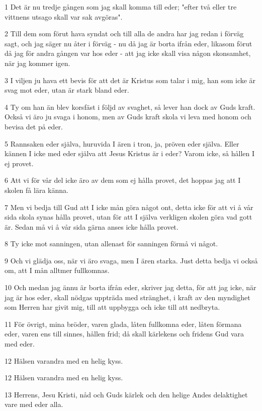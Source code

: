 \par 1 Det är nu tredje gången som jag skall komma till eder; "efter två eller tre vittnens utsago skall var sak avgöras".
\par 2 Till dem som förut hava syndat och till alla de andra har jag redan i förväg sagt, och jag säger nu åter i förväg - nu då jag är borta ifrån eder, likasom förut då jag för andra gången var hos eder - att jag icke skall visa någon skonsamhet, när jag kommer igen.
\par 3 I viljen ju hava ett bevis för att det är Kristus som talar i mig, han som icke är svag mot eder, utan är stark bland eder.
\par 4 Ty om han än blev korsfäst i följd av svaghet, så lever han dock av Guds kraft. Också vi äro ju svaga i honom, men av Guds kraft skola vi leva med honom och bevisa det på eder.
\par 5 Rannsaken eder själva, huruvida I ären i tron, ja, pröven eder själva. Eller kännen I icke med eder själva att Jesus Kristus är i eder? Varom icke, så hållen I ej provet.
\par 6 Att vi för vår del icke äro av dem som ej hålla provet, det hoppas jag att I skolen få lära känna.
\par 7 Men vi bedja till Gud att I icke mån göra något ont, detta icke för att vi å vår sida skola synas hålla provet, utan för att I själva verkligen skolen göra vad gott är. Sedan må vi å vår sida gärna anses icke hålla provet.
\par 8 Ty icke mot sanningen, utan allenast för sanningen förmå vi något.
\par 9 Och vi glädja oss, när vi äro svaga, men I ären starka. Just detta bedja vi också om, att I mån alltmer fullkomnas.
\par 10 Och medan jag ännu är borta ifrån eder, skriver jag detta, för att jag icke, när jag är hos eder, skall nödgas uppträda med stränghet, i kraft av den myndighet som Herren har givit mig, till att uppbygga och icke till att nedbryta.
\par 11 För övrigt, mina bröder, varen glada, låten fullkomna eder, låten förmana eder, varen ens till sinnes, hållen frid; då skall kärlekens och fridens Gud vara med eder.
\par 12 Hälsen varandra med en helig kyss.
\par 12 Hälsen varandra med en helig kyss.
\par 13 Herrens, Jesu Kristi, nåd och Guds kärlek och den helige Andes delaktighet vare med eder alla.



